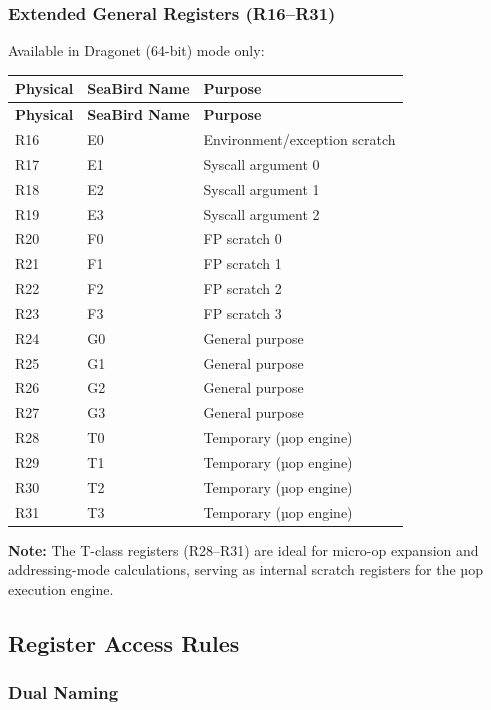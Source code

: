 \documentclass[12pt]{article}
\begin{document}
\subsubsection{Extended General Registers (R16--R31)}

Available in Dragonet (64-bit) mode only:

\begin{longtable}{@{}lll@{}}
\toprule
\textbf{Physical} & \textbf{SeaBird Name} & \textbf{Purpose} \\ \midrule
\endfirsthead
\toprule
\textbf{Physical} & \textbf{SeaBird Name} & \textbf{Purpose} \\ \midrule
\endhead
R16 & E0 & Environment/exception scratch \\
R17 & E1 & Syscall argument 0 \\
R18 & E2 & Syscall argument 1 \\
R19 & E3 & Syscall argument 2 \\
R20 & F0 & FP scratch 0 \\
R21 & F1 & FP scratch 1 \\
R22 & F2 & FP scratch 2 \\
R23 & F3 & FP scratch 3 \\
R24 & G0 & General purpose \\
R25 & G1 & General purpose \\
R26 & G2 & General purpose \\
R27 & G3 & General purpose \\
R28 & T0 & Temporary (µop engine) \\
R29 & T1 & Temporary (µop engine) \\
R30 & T2 & Temporary (µop engine) \\
R31 & T3 & Temporary (µop engine) \\ \bottomrule
\end{longtable}

\textbf{Note:} The T-class registers (R28--R31) are ideal for micro-op expansion and addressing-mode calculations, serving as internal scratch registers for the µop execution engine.

\subsection{Register Access Rules}

\subsubsection{Dual Naming}
\end{document}
